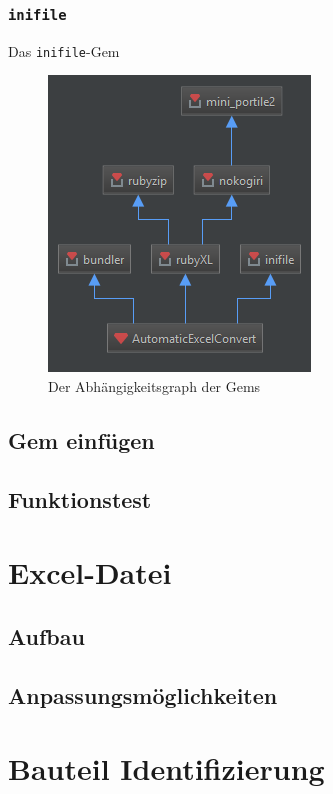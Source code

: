 \documentclass{book}
\newcommand{\inifile}{\texttt{inifile}\xspace}
\begin{document}
			\subsection{\inifile} \label{inifile}
				Das \inifile-Gem 
				\hspace*{2cm}
				
			\begin{figure}
				\centering
				\includegraphics[scale=0.6]{pics/Gemdependency-full.png} %
				\caption{Der Abhängigkeitsgraph der Gems}
				\label{Abhaengigkeitsgraph}
			\end{figure}
			
			
		\section{Gem einfügen}
			
		\section{Funktionstest}
	\chapter{Excel-Datei}
		\section{Aufbau}
		\section{Anpassungsmöglichkeiten}
	\chapter{Bauteil Identifizierung}
\end{document}
